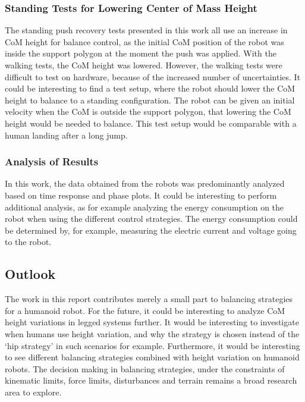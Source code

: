 \subsubsection{Standing Tests for Lowering Center of Mass Height}
The standing push recovery tests presented in this work all use an increase in \ac{CoM} height for balance control, as the initial \ac{CoM} position of the robot was inside the support polygon at the moment the push was applied. With the walking tests, the \ac{CoM} height was lowered. However, the walking tests were difficult to test on hardware, because of the increased number of uncertainties. It could be interesting to find a test setup, where the robot should lower the \ac{CoM} height to balance to a standing configuration. The robot can be given an initial velocity when the \ac{CoM} is outside the support polygon, that lowering the \ac{CoM} height would be needed to balance. This test setup would be comparable with a human landing after a long jump.
\subsubsection{Analysis of Results}
In this work, the data obtained from the robots was predominantly analyzed based on time response and phase plots. It could be interesting to perform additional analysis, as for example analyzing the energy consumption on the robot when using the different control strategies. The energy consumption could be determined by, for example, measuring the electric current and voltage going to the robot.

\subsection{Outlook}
The work in this report contributes merely a small part to balancing strategies for a humanoid robot. For the future, it could be interesting to analyze \ac{CoM} height variations in legged systems further. It would be interesting to investigate when humans use height variation, and why the strategy is chosen instead of the `hip strategy' in such scenarios for example. Furthermore, it would be interesting to see different balancing strategies combined with height variation on humanoid robots. The decision making in balancing strategies, under the constraints of kinematic limits, force limits, disturbances and terrain remains a broad research area to explore.